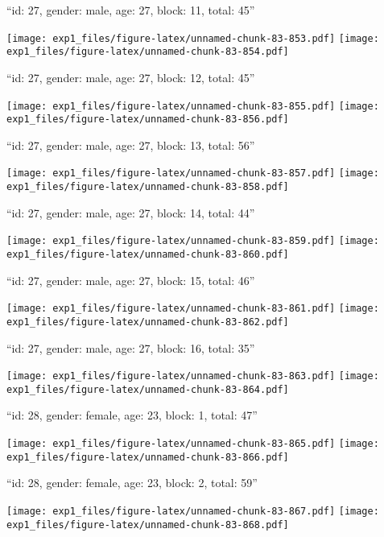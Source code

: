\documentclass[11pt,,]{article}
\begin{document}
\newpage
[1] 

``id: 27, gender: male, age: 27, block: 11, total: 45''

\texttt{[image: exp1\_files/figure-latex/unnamed-chunk-83-853.pdf]}
\texttt{[image: exp1\_files/figure-latex/unnamed-chunk-83-854.pdf]}

\newpage
[1] 

``id: 27, gender: male, age: 27, block: 12, total: 45''

\texttt{[image: exp1\_files/figure-latex/unnamed-chunk-83-855.pdf]}
\texttt{[image: exp1\_files/figure-latex/unnamed-chunk-83-856.pdf]}

\newpage
[1] 

``id: 27, gender: male, age: 27, block: 13, total: 56''

\texttt{[image: exp1\_files/figure-latex/unnamed-chunk-83-857.pdf]}
\texttt{[image: exp1\_files/figure-latex/unnamed-chunk-83-858.pdf]}

\newpage
[1] 

``id: 27, gender: male, age: 27, block: 14, total: 44''

\texttt{[image: exp1\_files/figure-latex/unnamed-chunk-83-859.pdf]}
\texttt{[image: exp1\_files/figure-latex/unnamed-chunk-83-860.pdf]}

\newpage
[1] 

``id: 27, gender: male, age: 27, block: 15, total: 46''

\texttt{[image: exp1\_files/figure-latex/unnamed-chunk-83-861.pdf]}
\texttt{[image: exp1\_files/figure-latex/unnamed-chunk-83-862.pdf]}

\newpage
[1] 

``id: 27, gender: male, age: 27, block: 16, total: 35''

\texttt{[image: exp1\_files/figure-latex/unnamed-chunk-83-863.pdf]}
\texttt{[image: exp1\_files/figure-latex/unnamed-chunk-83-864.pdf]}

\newpage
[1] 

``id: 28, gender: female, age: 23, block: 1, total: 47''

\texttt{[image: exp1\_files/figure-latex/unnamed-chunk-83-865.pdf]}
\texttt{[image: exp1\_files/figure-latex/unnamed-chunk-83-866.pdf]}

\newpage
[1] 

``id: 28, gender: female, age: 23, block: 2, total: 59''

\texttt{[image: exp1\_files/figure-latex/unnamed-chunk-83-867.pdf]}
\texttt{[image: exp1\_files/figure-latex/unnamed-chunk-83-868.pdf]}
\end{document}
